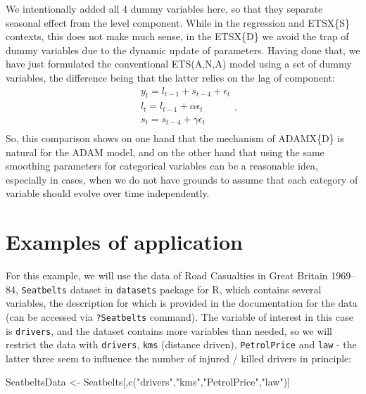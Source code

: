 \documentclass[
]{book}
\newenvironment{Shaded}{\begin{snugshade}}{\end{snugshade}}
\newcommand{\FunctionTok}[1]{\textcolor[rgb]{0.00,0.00,0.00}{#1}}
\newcommand{\NormalTok}[1]{#1}
\newcommand{\OtherTok}[1]{\textcolor[rgb]{0.56,0.35,0.01}{#1}}
\newcommand{\StringTok}[1]{\textcolor[rgb]{0.31,0.60,0.02}{#1}}
\theoremstyle{definition}
\theoremstyle{definition}
\theoremstyle{definition}
\theoremstyle{definition}
\theoremstyle{remark}
\begin{document}
We intentionally added all 4 dummy variables here, so that they separate seasonal effect from the level component. While in the regression and ETSX\{S\} contexts, this does not make much sense, in the ETSX\{D\} we avoid the trap of dummy variables due to the dynamic update of parameters. Having done that, we have just formulated the conventional ETS(A,N,A) model using a set of dummy variables, the difference being that the latter relies on the lag of component:
\begin{equation}
  \begin{aligned}
    & y_{t} = l_{t-1} + s_{t-4} + \epsilon_t \\
    & l_t = l_{t-1} + \alpha \epsilon_t \\
    & s_t = s_{t-4} + \gamma \epsilon_t \\
  \end{aligned} .
  \label{eq:ADAMETSANAQuarterly}
\end{equation}
So, this comparison shows on one hand that the mechanism of ADAMX\{D\} is natural for the ADAM model, and on the other hand that using the same smoothing parameters for categorical variables can be a reasonable idea, especially in cases, when we do not have grounds to assume that each category of variable should evolve over time independently.

\hypertarget{ETSXRExample}{%
\section{Examples of application}\label{ETSXRExample}}

For this example, we will use the data of Road Casualties in Great Britain 1969--84, \texttt{Seatbelts} dataset in \texttt{datasets} package for R, which contains several variables, the description for which is provided in the documentation for the data (can be accessed via \texttt{?Seatbelts} command). The variable of interest in this case is \texttt{drivers}, and the dataset contains more variables than needed, so we will restrict the data with \texttt{drivers}, \texttt{kms} (distance driven), \texttt{PetrolPrice} and \texttt{law} - the latter three seem to influence the number of injured / killed drivers in principle:

\begin{Shaded}
\begin{Highlighting}[]
\NormalTok{SeatbeltsData }\OtherTok{\textless{}{-}}\NormalTok{ Seatbelts[,}\FunctionTok{c}\NormalTok{(}\StringTok{"drivers"}\NormalTok{,}\StringTok{"kms"}\NormalTok{,}\StringTok{"PetrolPrice"}\NormalTok{,}\StringTok{"law"}\NormalTok{)]}
\end{Highlighting}
\end{Shaded}
\end{document}
